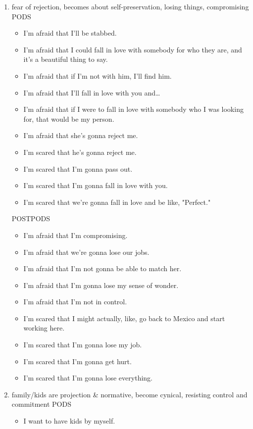 \documentclass[11pt]{article}
\begin{document}
\begin{enumerate}
\begin{enumerate}
\begin{enumerate}
\item fear of rejection, becomes about self-preservation, losing things, compromising
\label{sec:org9930b6f}
PODS
\begin{itemize}
\item I'm afraid that I'll be stabbed.
\item I'm afraid that I could fall in love with somebody for who they are, and it's a beautiful thing to say.
\item I'm afraid that if I'm not with him, I'll find him.
\item I'm afraid that I'll fall in love with you and\ldots{}
\item I'm afraid that if I were to fall in love with somebody who I was looking for, that would be my person.
\item I'm afraid that she's gonna reject me.
\item I'm scared that he's gonna reject me.
\item I'm scared that I'm gonna pass out.
\item I'm scared that I'm gonna fall in love with you.
\item I'm scared that we're gonna fall in love and be like, "Perfect."
\end{itemize}

POSTPODS
\begin{itemize}
\item I'm afraid that I'm compromising.
\item I'm afraid that we're gonna lose our jobs.
\item I'm afraid that I'm not gonna be able to match her.
\item I'm afraid that I'm gonna lose my sense of wonder.
\item I'm afraid that I'm not in control.
\item I'm scared that I might actually, like, go back to Mexico and start working here.
\item I'm scared that I'm gonna lose my job.
\item I'm scared that I'm gonna get hurt.
\item I'm scared that I'm gonna lose everything.
\end{itemize}

\item family/kids are projection \& normative, become cynical, resisting control and commitment
\label{sec:orgc66e5c5}
PODS
\begin{itemize}
\item I want to have kids by myself.
\end{itemize}


\end{enumerate}
\end{enumerate}
\end{enumerate}
\end{document}
